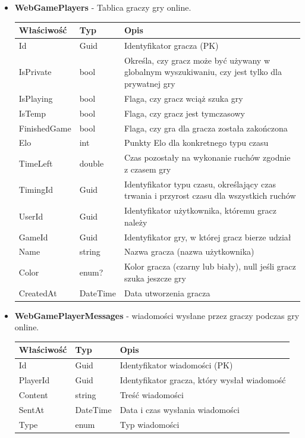 \documentclass[12pt,a4paper]{article}
\begin{document}
\begin{itemize}
    \item \textbf{WebGamePlayers} - Tablica graczy gry online.
    \begin{longtable}{|m{4cm}|m{2cm}|m{8cm}|}
        \hline
        \textbf{Właściwość} & \textbf{Typ} & \textbf{Opis} \\ \hline
        \endhead
        \hline
        Id & Guid & Identyfikator gracza (PK) \\ \hline
        IsPrivate & bool & Określa, czy gracz może być używany w globalnym wyszukiwaniu, czy jest tylko dla prywatnej gry \\ \hline
        IsPlaying & bool & Flaga, czy gracz wciąż szuka gry \\ \hline
        IsTemp & bool & Flaga, czy gracz jest tymczasowy \\ \hline
        FinishedGame & bool & Flaga, czy gra dla gracza została zakończona \\ \hline
        Elo & int & Punkty Elo dla konkretnego typu czasu \\ \hline
        TimeLeft & double & Czas pozostały na wykonanie ruchów zgodnie z czasem gry \\ \hline
        TimingId & Guid & Identyfikator typu czasu, określający czas trwania i przyrost czasu dla wszystkich ruchów \\ \hline
        UserId & Guid & Identyfikator użytkownika, któremu gracz należy \\ \hline
        GameId & Guid & Identyfikator gry, w której gracz bierze udział \\ \hline
        Name & string & Nazwa gracza (nazwa użytkownika) \\ \hline
        Color & enum? & Kolor gracza (czarny lub biały), null jeśli gracz szuka jeszcze gry \\ \hline
        CreatedAt & DateTime & Data utworzenia gracza \\ \hline
    \end{longtable}

    \item \textbf{WebGamePlayerMessages} - wiadomości wysłane przez graczy podczas gry online.
    \begin{longtable}{|m{4cm}|m{2cm}|m{8cm}|}
        \hline
        \textbf{Właściwość} & \textbf{Typ} & \textbf{Opis} \\ \hline
        \endhead
        \hline
        Id & Guid & Identyfikator wiadomości (PK) \\ \hline
        PlayerId & Guid & Identyfikator gracza, który wysłał wiadomość \\ \hline
        Content & string & Treść wiadomości \\ \hline
        SentAt & DateTime & Data i czas wysłania wiadomości \\ \hline
        Type & enum & Typ wiadomości \\ \hline
    \end{longtable}
        

\end{itemize}
\end{document}
